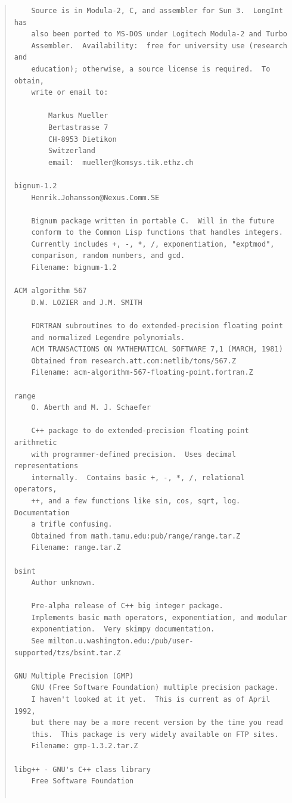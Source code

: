 \begin{quote}
\begin{scriptsize}
\begin{verbatim}
    Source is in Modula-2, C, and assembler for Sun 3.  LongInt has
    also been ported to MS-DOS under Logitech Modula-2 and Turbo
    Assembler.  Availability:  free for university use (research and
    education); otherwise, a source license is required.  To obtain,
    write or email to:

        Markus Mueller
        Bertastrasse 7
        CH-8953 Dietikon
        Switzerland
        email:  mueller@komsys.tik.ethz.ch

bignum-1.2
    Henrik.Johansson@Nexus.Comm.SE

    Bignum package written in portable C.  Will in the future
    conform to the Common Lisp functions that handles integers.
    Currently includes +, -, *, /, exponentiation, "exptmod",
    comparison, random numbers, and gcd.
    Filename: bignum-1.2

ACM algorithm 567
    D.W. LOZIER and J.M. SMITH

    FORTRAN subroutines to do extended-precision floating point
    and normalized Legendre polynomials.
    ACM TRANSACTIONS ON MATHEMATICAL SOFTWARE 7,1 (MARCH, 1981)
    Obtained from research.att.com:netlib/toms/567.Z
    Filename: acm-algorithm-567-floating-point.fortran.Z

range
    O. Aberth and M. J. Schaefer

    C++ package to do extended-precision floating point arithmetic
    with programmer-defined precision.  Uses decimal representations
    internally.  Contains basic +, -, *, /, relational operators,
    ++, and a few functions like sin, cos, sqrt, log.  Documentation
    a trifle confusing.
    Obtained from math.tamu.edu:pub/range/range.tar.Z
    Filename: range.tar.Z

bsint
    Author unknown.

    Pre-alpha release of C++ big integer package.  
    Implements basic math operators, exponentiation, and modular 
    exponentiation.  Very skimpy documentation.
    See milton.u.washington.edu:/pub/user-supported/tzs/bsint.tar.Z

GNU Multiple Precision (GMP)
    GNU (Free Software Foundation) multiple precision package.
    I haven't looked at it yet.  This is current as of April 1992,
    but there may be a more recent version by the time you read 
    this.  This package is very widely available on FTP sites.
    Filename: gmp-1.3.2.tar.Z

libg++ - GNU's C++ class library
    Free Software Foundation


\end{verbatim}
\end{scriptsize}
\end{quote}
